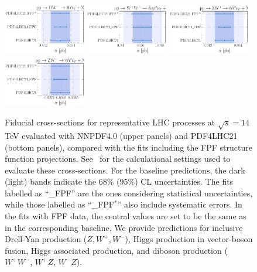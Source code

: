 \begin{figure}[htbp]
\includegraphics[width=0.32\textwidth]{plots/LHCpheno/NNPDF_HWM_14TEV_40_PHENO-integrated-pdf4lhc21.pdf}
\includegraphics[width=0.32\textwidth]{plots/LHCpheno/NNPDF_WPWM_14TEV_40_PHENO-integrated-pdf4lhc21.pdf}
\includegraphics[width=0.32\textwidth]{plots/LHCpheno/NNPDF_WPZ_14TEV_40_PHENO-integrated-pdf4lhc21.pdf}
\includegraphics[width=0.32\textwidth]{plots/LHCpheno/NNPDF_WMZ_14TEV_40_PHENO-integrated-pdf4lhc21.pdf}
\caption{Fiducial cross-sections for representative LHC processes at $\sqrt{s}=14$ TeV
  evaluated with NNPDF4.0 (upper panels) and PDF4LHC21 (bottom panels),
  compared with the fits including the FPF structure function projections.
  See~\cite{NNPDF:2021njg,PDF4LHCWorkingGroup:2022cjn} for the calculational settings
  used to evaluate these cross-sections.
%
For the baseline
predictions, the dark (light) bands indicate the 68\% (95\%) CL uncertainties.
%
The fits labelled as ``\_FPF'' are the ones considering statistical uncertainties,
while those labelled as ``\_FPF$^*$'' also include systematic errors.
%
In the fits with FPF data, the central values are set to be the same as
in the corresponding baseline.
%
We provide predictions for inclusive Drell-Yan production ($Z, W^+, W^-$), Higgs production
in vector-boson fusion, Higgs associated
production, and diboson production ($W^+W^-$, $W^+Z$, $W^-Z$).
%
}
\label{fig:NNPDF40_pheno_integrated}
\end{figure}


